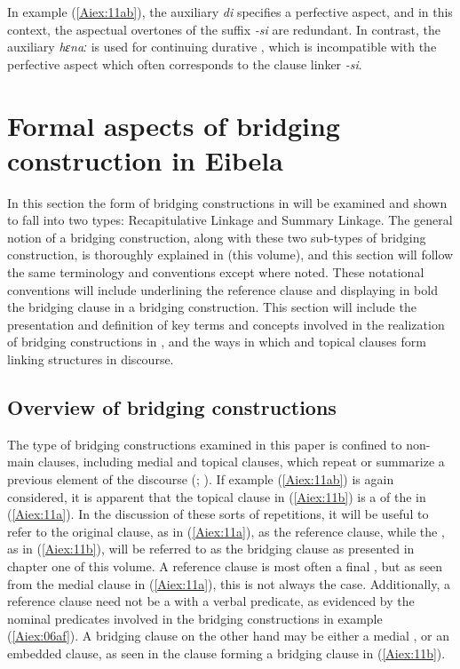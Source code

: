 \documentclass[output=paper]{LSP/langsci}
\begin{document}
In example (\ref{Aiex:11ab}), the auxiliary \textit{di} specifies a perfective aspect, and in this context, the aspectual overtones of the suffix \textit{-si} are redundant. In contrast, the auxiliary \textit{hɛnaː} is used for continuing durative , which is incompatible with the perfective aspect which often corresponds to the clause linker \textit{-si}.

\section{Formal aspects of bridging construction in Eibela} 
\label{AiFormal.aspects}
In this section the form of bridging constructions in  will be examined and shown to fall into two types: Recapitulative Linkage and Summary Linkage. The general notion of a bridging construction, along with these two sub-types of bridging construction, is thoroughly explained in \citeauthor{guerin18} (this volume), and this section will follow the same terminology and conventions except where noted. These notational conventions will include underlining the reference clause and displaying in bold the bridging clause in a bridging construction. This section will include the presentation and definition of key terms and concepts involved in the realization of bridging constructions in , and the ways in which  and topical clauses form linking structures in  discourse. 


\subsection{Overview of bridging constructions} 
\label{AiOverview}
The type of bridging constructions examined in this paper is confined to non-main clauses, including medial and topical clauses, which repeat or summarize a previous element of the discourse (\citealt{devries.2005,devries.2006,dixon09}; \citealt[][382--383]{Thompson.et.al.2007}). If example (\ref{Aiex:11ab}) is again considered, it is apparent that the topical clause in (\ref{Aiex:11b}) is a  of the  in (\ref{Aiex:11a}). In the discussion of these sorts of repetitions, it will be useful to refer to the original clause, as in (\ref{Aiex:11a}), as the reference clause, while the , as in (\ref{Aiex:11b}), will be referred to as the bridging clause as presented in chapter one of this volume. A reference clause is most often a final , but as seen from the medial clause in (\ref{Aiex:11a}), this is not always the case. Additionally, a reference clause need not be a  with a verbal predicate, as evidenced by the nominal predicates involved in the bridging constructions in example (\ref{Aiex:06af}). A bridging clause on the other hand may be either a medial , or an embedded  clause, as seen in the  clause forming a bridging clause in (\ref{Aiex:11b}).
\end{document}
